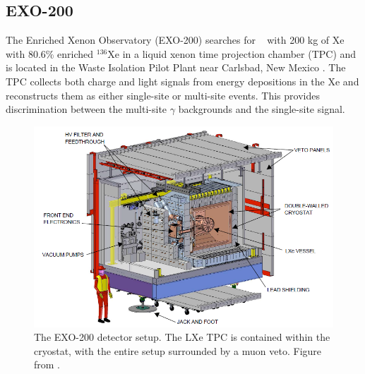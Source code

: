 \subsection{EXO-200}
The Enriched Xenon Observatory (EXO-200) searches for \zeronubb~ with 200 kg of Xe with 80.6\% enriched $^{136}$Xe in a liquid xenon time projection chamber (TPC) and is located in the Waste Isolation Pilot Plant near Carlsbad, New Mexico \cite{Albert:2017owj}.
The TPC collects both charge and light signals from energy depositions in the Xe and reconstructs them as either single-site or multi-site events.
This provides discrimination between the multi-site $\gamma$ backgrounds and the single-site signal.
\begin{figure}[htbp]
    \centering
    \includegraphics[width=0.7\linewidth]{Figures/EXO.png}
    \caption[The EXO-200 detector setup]
    {The EXO-200 detector setup.
    The LXe TPC is contained within the cryostat, with the entire setup surrounded by a muon veto.
    Figure from \cite{Auger:2012gs}.}
    \label{fig:EXO}
\end{figure}

